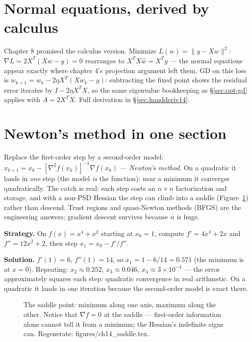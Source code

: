\section{Normal equations, derived by calculus}\label{sec:opt-normal}

Chapter 8 promised the calculus version. Minimize
$L(w)=\|y-Xw\|^2$: $\nabla L=2X^T(Xw-y)=0$ rearranges to
$X^TX\hat w=X^Ty$ --- the normal equations appear exactly where
chapter 4's projection argument left them. GD on this loss is
$w_{k+1}=w_k-2\eta X^T(Xw_k-y)$: subtracting the fixed point shows
the residual error iterates by $I-2\eta X^TX$, so the same
eigenvalue bookkeeping as \S\ref{sec:opt-gd} applies with
$A=2X^TX$. Full derivation in \S\ref{sec:handderiv14}.

\section{Newton's method in one section}\label{sec:opt-newton}

Replace the first-order step by a second-order model:
$x_{k+1}=x_k-[\nabla^2 f(x_k)]^{-1}\nabla f(x_k)$ ---
\emph{Newton's method}. On a quadratic it lands
in \emph{one} step (the model \emph{is} the function); near a minimum it
converges quadratically. The catch is real: each step costs an
$n\times n$ factorization and storage, and with a non-PSD Hessian the
step can climb into a saddle (Figure~\ref{fig:saddle}) rather than
descend. Trust regions and quasi-Newton methods (BFGS) are the
engineering answers; gradient descent survives because $n$ is huge.

\begin{example}\label{ex:newtonstep}
\textbf{Strategy.} On $f(x)=x^4+x^2$ starting at $x_0=1$, compute
$f'=4x^3+2x$ and $f''=12x^2+2$, then step
$x_1=x_0-f'/f''$.

\textbf{Solution.} $f'(1)=6$, $f''(1)=14$, so $x_1=1-6/14=0.571$
(the minimum is at $x=0$). Repeating: $x_2\approx0.252$,
$x_3\approx0.046$, $x_4\approx3\times10^{-4}$ --- the error
approximately squares each step: quadratic convergence in real
arithmetic. On a quadratic it lands in one iteration because the
second-order model is exact there.
\end{example}

\begin{figure}[htbp]
\centering

\caption{The saddle point: minimum along one axis, maximum along the
other. Notice that $\nabla f=0$ at the saddle --- first-order
information alone cannot tell it from a minimum; the Hessian's indefinite
signs can. Regenerate: \ttfamily figures/ch14\_saddle.tex.}
\label{fig:saddle}
\end{figure}

